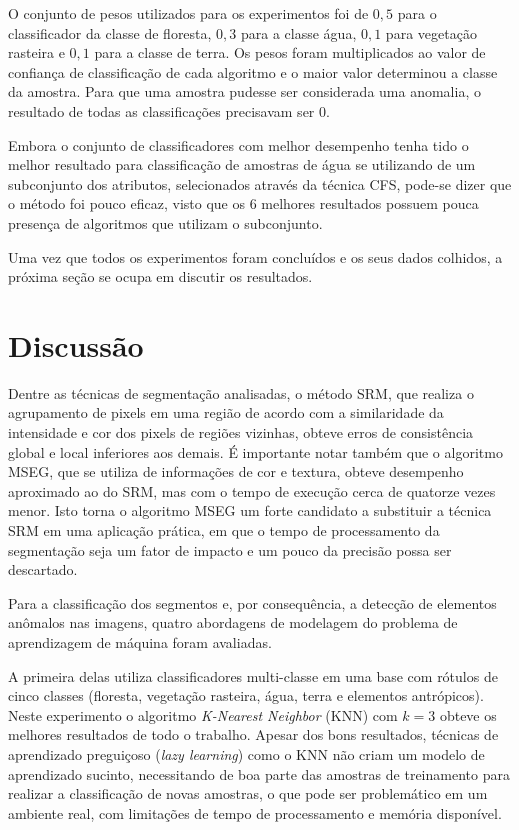 O conjunto de pesos utilizados para os experimentos foi de $0,5$ para o classificador da classe de floresta, $0,3$ para a classe água, $0,1$ para vegetação rasteira e $0,1$ para a classe de terra. Os pesos foram multiplicados ao valor de confiança de classificação de cada algoritmo e o maior valor determinou a classe da amostra. Para que uma amostra pudesse ser considerada uma anomalia, o resultado de todas as classificações precisavam ser $0$.

Embora o conjunto de classificadores com melhor desempenho tenha tido o melhor resultado para classificação de amostras de água se utilizando de um subconjunto dos atributos, selecionados através da técnica CFS, pode-se dizer que o método foi pouco eficaz, visto que os 6 melhores resultados possuem pouca presença de algoritmos que utilizam o subconjunto.

Uma vez que todos os experimentos foram concluídos e os seus dados colhidos, a próxima seção se ocupa em discutir os resultados.

\section{Discussão}

Dentre as técnicas de segmentação analisadas, o método SRM, que realiza o agrupamento de pixels em uma região de acordo com a similaridade da intensidade e cor dos pixels de regiões vizinhas, obteve erros de consistência global e local inferiores aos demais. É importante notar também que o algoritmo MSEG, que se utiliza de informações de cor e textura, obteve desempenho aproximado ao do SRM, mas com o tempo de execução cerca de quatorze vezes menor. Isto torna o algoritmo MSEG um forte candidato a substituir a técnica SRM em uma aplicação prática, em que o tempo de processamento da segmentação seja um fator de impacto e um pouco da precisão possa ser descartado.

Para a classificação dos segmentos e, por consequência, a detecção de elementos anômalos nas imagens, quatro abordagens de modelagem do problema de aprendizagem de máquina foram avaliadas.

A primeira delas utiliza classificadores multi-classe em uma base com rótulos de cinco classes (floresta, vegetação rasteira, água, terra e elementos antrópicos). Neste experimento o algoritmo \textit{K-Nearest Neighbor} (KNN) com $k=3$ obteve os melhores resultados de todo o trabalho. Apesar dos bons resultados, técnicas de aprendizado preguiçoso (\textit{lazy learning}) como o KNN não criam um modelo de aprendizado sucinto, necessitando de boa parte das amostras de treinamento para realizar a classificação de novas amostras, o que pode ser problemático em um ambiente real, com limitações de tempo de processamento e memória disponível.

